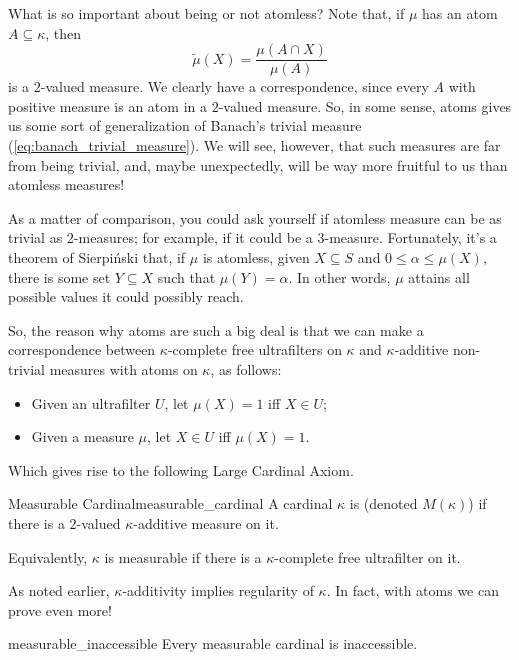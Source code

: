 What is so important about being or not atomless? Note that, if $\mu$ has an atom $A\subseteq\kappa$, then
$$\widetilde{\mu}(X)=\frac{\mu(A\cap X)}{\mu(A)}$$
is a $2$-valued measure. We clearly have a correspondence, since every $A$ with positive measure is an atom in a $2$-valued measure. So, in some sense, atoms gives us some sort of generalization of Banach's trivial measure (\ref{eq:banach_trivial_measure}). We will see, however, that such measures are far from being trivial, and, maybe unexpectedly, will be way more fruitful to us than atomless measures!

As a matter of comparison, you could ask yourself if atomless measure can be as trivial as $2$-measures; for example, if it could be a $3$-measure. Fortunately, it's a theorem of Sierpiński that, if $\mu$ is atomless, given $X\subseteq S$ and $0\leq\alpha\leq\mu(X)$, there is some set $Y\subseteq X$ such that $\mu(Y)=\alpha$. In other words, $\mu$ attains all possible values it could possibly reach.

So, the reason why atoms are such a big deal is that we can make a correspondence between $\kappa$-complete free ultrafilters on $\kappa$ and $\kappa$-additive non-trivial measures with atoms on $\kappa$, as follows:
\begin{itemize}
    \item Given an ultrafilter $U$, let $\mu(X)=1$ iff $X\in U$;
    \item Given a measure $\mu$, let $X\in U$ iff $\mu(X)=1$.
\end{itemize}

Which gives rise to the following Large Cardinal Axiom.

\begin{definition}{Measurable Cardinal}{measurable_cardinal}
    A cardinal $\kappa$ is  (denoted $M(\kappa)$) if there is a $2$-valued $\kappa$-additive measure on it.

    Equivalently, $\kappa$ is measurable if there is a $\kappa$-complete free ultrafilter on it.
\end{definition}

As noted earlier, $\kappa$-additivity implies regularity of $\kappa$. In fact, with atoms we can prove even more!

\begin{theorem}{}{measurable_inaccessible}
    Every measurable cardinal is inaccessible.
\end{theorem}

